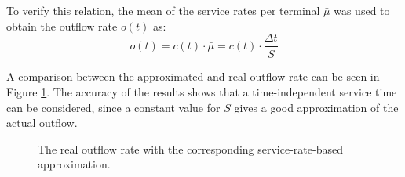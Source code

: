 To verify this relation, the mean of the service rates per terminal \( \bar{\mu} \) was used to obtain the outflow rate \( o(t) \) as:
\begin{equation}
  o(t) = c(t) \cdot \bar{\mu} = c(t) \cdot \frac{\Delta t}{\bar{S}}
\end{equation}

A comparison between the approximated and real outflow rate can be seen in Figure \ref{fig:outflow_approximation}. The accuracy of the results shows that a time-independent service time can be considered, since a constant value for \( S \) gives a good approximation of the actual outflow.

\begin{figure}
  \begin{center}
  \end{center}
  \caption{The real outflow rate with the corresponding service-rate-based approximation.}
  \label{fig:outflow_approximation}
\end{figure}

\clearpage